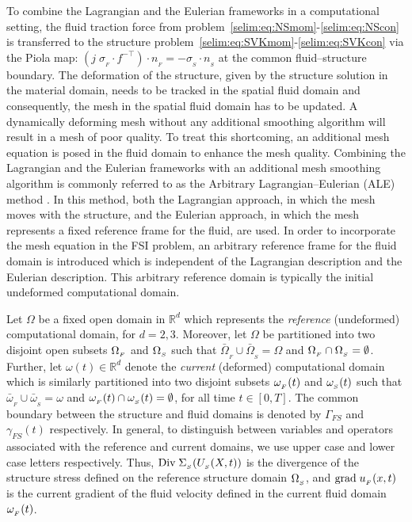To combine the Lagrangian and the Eulerian frameworks in a
computational setting, the fluid traction force from
problem~\eqref{selim:eq:NSmom}-\eqref{selim:eq:NScon} is transferred
to the structure
problem~\eqref{selim:eq:SVKmom}-\eqref{selim:eq:SVKcon} via the Piola
map: $(j\;\sigma_{_{F}}\cdot f^{-\top})\cdot n_{_{F}} = -
\sigma_{_{S}}\cdot n_{_{S}}$ at the common fluid--structure boundary.
The deformation of the structure, given by the structure solution in
the material domain, needs to be tracked in the spatial fluid domain
and consequently, the mesh in the spatial fluid domain has to be
updated. A dynamically deforming mesh without any additional smoothing
algorithm will result in a mesh of poor quality. To treat this
shortcoming, an additional mesh equation is posed in the fluid domain
to enhance the mesh quality. Combining the Lagrangian and the Eulerian
frameworks with an additional mesh smoothing algorithm is commonly
referred to as the Arbitrary Lagrangian--Eulerian (ALE) method
\citep{DoneaGiulianiHalleux1982,DoneaHuertaPonthotEtAl2004}. In this
method, both the Lagrangian approach, in which the mesh moves with the
structure, and the Eulerian approach, in which the mesh represents a
fixed reference frame for the fluid, are used. In order to incorporate
the mesh equation in the FSI problem, an arbitrary reference frame for
the fluid domain is introduced which is independent of the Lagrangian
description and the Eulerian description. This arbitrary reference
domain is typically the initial undeformed computational domain.

Let $\Omega$ be a fixed open domain in $\mathbb{R}^d$ which represents
the \emph{reference} (undeformed) computational domain, for
$d=2,3$. Moreover, let $\Omega$ be partitioned into two disjoint open
subsets $\Omega_{_{F}}$ and $\Omega_{_{S}}$ such that
$\bar{\Omega}_{_{F}}\cup\bar{\Omega}_{_{S}} = \Omega$ and
$\Omega_{_{F}}\cap\Omega_{_{S}}=\emptyset$. Further, let $\omega(t)\in\mathbb{R}^d$ denote
the \emph{current} (deformed) computational domain which is similarly
partitioned into two disjoint subsets $\omega_{_{F}}(t)$ and $\omega_{_{S}}(t)$ such that
$\bar{\omega}_{_{F}}\cup\bar{\omega}_{_{S}} = \omega$ and
$\omega_{_{F}}(t)\cap\omega_{_{S}}(t)=\emptyset$, for all time $t\in[0,T]$. The common
boundary between the structure and fluid domains is denoted by
$\Gamma_{FS}$ and $\gamma_{FS}(t)$ respectively. In general, to
distinguish between variables and operators associated with the
reference and current domains, we use upper case and lower case
letters respectively. Thus, $\textrm{Div}\;\Sigma_{_{S}}(U_{_{S}}(X,t))$ is the divergence
of the structure stress defined on the reference structure domain
$\Omega_{_{S}}$, and $\textrm{grad}\;u_{_{F}}(x,t)$ is the current gradient of the fluid
velocity defined in the current fluid domain $\omega_{_{F}}(t)$.

